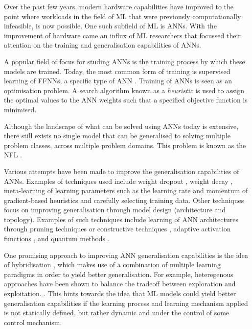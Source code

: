 Over the past few years, modern hardware capabilities have improved to the
point where workloads in the field of \ac{ML} that were previously computationally
infeasible, is now possible. One such subfield of \ac{ML} is \acp{ANN}. With
the improvement of hardware came an influx of \ac{ML} researchers that focussed
their attention on the training and generalisation capabilities of \acp{ANN}.

A popular field of focus for studing \acp{ANN} is the training process by which
these models are trained. Today, the most common form of training is
supervised learning of \acp{FFNN}, a specific type of
\ac{ANN} \cite{ref:reed:1999}. Training of \acp{ANN} is seen as an optimisation problem.
A search algorithm known as a \textit{heuristic}
\cite{ref:pearl:1984} is used to assign the optimal values to the \ac{ANN}
weights such that a specified objective function is minimised.

Although the landscape of what can be solved using \acp{ANN} today
is extensive, there still exists no single model that can be generalised to
solving multiple problem classes, across multiple problem domains. This problem
is known as the \ac{NFL} \cite{ref:wolpert:1997}.

Various attempts have been made to improve the generalisation capabilities of
\acp{ANN}. Examples of techniques used include weight dropout
\cite{ref:srivastava:2014}, weight decay
\cite{ref:krogh:1992}, meta-learning of learning parameters
such as the learning rate and momentum of
gradient-based heuristics \cite{ref:zeiler:2012, ref:lv:2017, ref:darken:1992}
and carefully selecting training data. Other techniques focus on improving
generalisation through model design (architecture and topology). Examples of such
techniques include learning of \ac{ANN} architectures through pruning techniques
\cite{ref:cibas:1996, ref:engelbrecht:1996} or constructive techniques
\cite{ref:hassibi:1994, ref:lecun:1990}, adaptive activation functions
\cite{ref:engelbrecht:1995, ref:fletcher:1994}, and quantum methods
\cite{ref:wan:2017, ref:ricks:2004}.  

One promising approach to improving \ac{ANN} generalisation capabilities is the
idea of hybridisation \cite{ref:burke:2013}, which makes use of a combination of
multiple learning paradigms in order to yield better generalisation. For
example, heteregenous approaches have been shown to balance the tradeoff between
exploration and exploitation. \cite{ref:nepomuceno:2013}. This hints towards the
idea that \ac{ML} models could yield better generalisation capabilities if the
learning process and learning mechanism applied is not statically defined, but
rather dynamic and under the control of some control mechanism.

